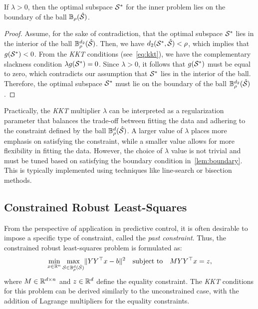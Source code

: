 \begin{lemma}\label{lem:boundary}
    If $\lambda > 0$, then the optimal subspace $\mathcal{S}^*$ for the inner problem lies on the boundary of the ball $\mathbb{B}_{\rho}(\hat{\mathcal{S}})$.
    \begin{proof}
        Assume, for the sake of contradiction, that the optimal subspace $\mathcal{S}^*$ lies in the interior of the ball $\mathbb{B}^{d_2}_{\rho}(\hat{\mathcal{S}})$. Then, we have $d_2(\mathcal{S}^*, \hat{\mathcal{S}}) < \rho$, which implies that $g(\mathcal{S}^*) < 0$. From the \emph{KKT} conditions (see~\eqref{eq:kkt}), we have the complementary slackness condition $\lambda g(\mathcal{S}^*) = 0$. Since $\lambda > 0$, it follows that $g(\mathcal{S}^*)$ must be equal to zero, which contradicts our assumption that $\mathcal{S}^*$ lies in the interior of the ball. Therefore, the optimal subspace $\mathcal{S}^*$ must lie on the boundary of the ball $\mathbb{B}^{d_2}_{\rho}(\hat{\mathcal{S}})$.
    \end{proof}
\end{lemma}

\begin{remark}\label{rem:lambda}
    Practically, the \emph{KKT} multiplier $\lambda$ can be interpreted as a regularization parameter that balances the trade-off between fitting the data and adhering to the constraint defined by the ball $\mathbb{B}^d_{\rho}(\hat{\mathcal{S}})$. A larger value of $\lambda$ places more emphasis on satisfying the constraint, while a smaller value allows for more flexibility in fitting the data. However, the choice of $\lambda$ value is not trivial and must be tuned based on satisfying the boundary condition in~\ref{lem:boundary}. This is typically implemented using techniques like line-search or bisection methods.
\end{remark}

\subsection{Constrained Robust Least-Squares}\label{subsec:cons-robust-ls}
From the perspective of application in predictive control, it is often desirable to impose a specific type of constraint, called the \emph{past constraint}. Thus, the constrained robust least-squares problem is formulated as:
\begin{equation}\label{eq:cons-robust-ls}
    \min_{x \in \mathbb{R}^n} \max_{\mathcal{S} \in \mathbb{B}^d_{\rho}(\hat{\mathcal{S}})} \lVert YY^\top x - b \rVert^2 \quad \textrm{subject to} \quad MYY^\top x = z,
\end{equation}
where $M \in \mathbb{R}^{d \times n}$ and $z \in \mathbb{R}^d$ define the equality constraint. The \emph{KKT} conditions for this problem can be derived similarly to the unconstrained case, with the addition of Lagrange multipliers for the equality constraints.

